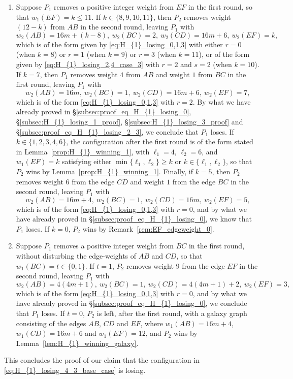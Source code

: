 \documentclass[11pt,reqno]{amsart}
\theoremstyle{definition}
\theoremstyle{definition}
\begin{document}
\begin{enumerate}
\item Suppose $P_{1}$ removes a positive integer weight from $EF$ in the first round, so that $w_{1}(EF)=k \leqslant 11$. If $k \in \{8,9,10,11\}$, then $P_{2}$ removes weight $(12-k)$ from $AB$ in the second round, leaving $P_{1}$ with 
\begin{equation}
w_{2}(AB)=16m+(k-8),\ w_{2}(BC)=2,\ w_{2}(CD)=16m+6,\ w_{2}(EF)=k,\nonumber
\end{equation}
which is of the form given by \eqref{eq:H_{1}_losing_0,1,3} with either $r=0$ (when $k=8$) or $r=1$ (when $k=9$) or $r=3$ (when $k=11$), or of the form given by \eqref{eq:H_{1}_losing_2,4_case_3} with $r=2$ and $s=2$ (when $k=10$). If $k=7$, then $P_{1}$ removes weight $4$ from $AB$ and weight $1$ from $BC$ in the first round, leaving $P_{1}$ with
\begin{equation}
w_{2}(AB)=16m,\ w_{2}(BC)=1,\ w_{2}(CD)=16m+6,\ w_{2}(EF)=7,\nonumber
\end{equation}
which is of the form \eqref{eq:H_{1}_losing_0,1,3} with $r=2$. By what we have already proved in \S\ref{subsec:proof_eq_H_{1}_losing_0}, \S\ref{subsec:H_{1}_losing_1_proof}, \S\ref{subsec:H_{1}_losing_3_proof} and \S\ref{subsec:proof_eq_H_{1}_losing_2_3}, we conclude that $P_{1}$ loses. If $k \in \{1,2,3,4,6\}$, the configuration after the first round is of the form stated in Lemma~\ref{prop:H_{1}_winning_1}, with $\ell_{1}=4$, $\ell_{2}=6$, and $w_{1}(EF)=k$ satisfying either $\min\{\ell_{1},\ell_{2}\}\geqslant k$ or $k \in \{\ell_{1},\ell_{2}\}$, so that $P_{2}$ wins by Lemma~\ref{prop:H_{1}_winning_1}. Finally, if $k=5$, then $P_{2}$ removes weight $6$ from the edge $CD$ and weight $1$ from the edge $BC$ in the second round, leaving $P_{1}$ with
\begin{equation}
w_{2}(AB)=16m+4,\ w_{2}(BC)=1,\ w_{2}(CD)=16m,\ w_{2}(EF)=5,\nonumber
\end{equation}
which is of the form \eqref{eq:H_{1}_losing_0,1,3} with $r=0$, and by what we have already proved in \S\ref{subsec:proof_eq_H_{1}_losing_0}, we know that $P_{1}$ loses. If $k=0$, $P_{2}$ wins by Remark~\ref{rem:EF_edgeweight_0}.

\item Suppose $P_{1}$ removes a positive integer weight from $BC$ in the first round, without disturbing the edge-weights of $AB$ and $CD$, so that $w_{1}(BC)=t \in \{0,1\}$. If $t=1$, $P_{2}$ removes weight $9$ from the edge $EF$ in the second round, leaving $P_{1}$ with
\begin{equation}
w_{2}(AB)=4(4m+1),\ w_{2}(BC)=1,\ w_{2}(CD)=4(4m+1)+2,\ w_{2}(EF)=3,\nonumber
\end{equation}
which is of the form \eqref{eq:H_{1}_losing_0,1,3} with $r=0$, and by what we have already proved in \S\ref{subsec:proof_eq_H_{1}_losing_0}, we conclude that $P_{1}$ loses. If $t=0$, $P_{2}$ is left, after the first round, with a galaxy graph consisting of the edges $AB$, $CD$ and $EF$, where $w_{1}(AB)=16m+4$, $w_{1}(CD)=16m+6$ and $w_{1}(EF)=12$, and $P_{2}$ wins by Lemma~\ref{lem:H_{1}_winning_galaxy}.
\end{enumerate}
This concludes the proof of our claim that the configuration in \eqref{eq:H_{1}_losing_4_3_base_case} is losing. 
\end{document}
